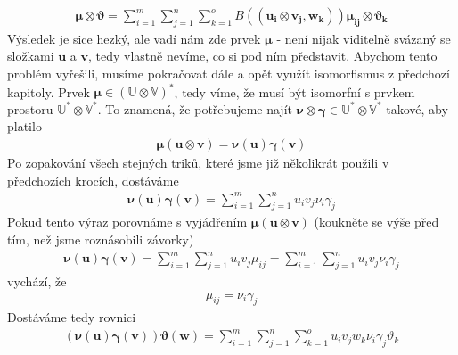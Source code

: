 \documentclass[a5paper,12pt]{amsbook}
\theoremstyle{definition}
\newcommand{\myvec}[1]{\bm{#1}}
\newcommand{\myspace}[1]{\mathbb{#1}}
\begin{document}
\begin{equation*}
\begin{split}
\myvec{\mu}\otimes\myvec{\vartheta} =
  \sum_{i=1}^{m}\sum_{j=1}^{n}\sum_{k=1}^{o} B((\myvec{u_i}\otimes\myvec{v_j}, \myvec{w_k}))
    \myvec{\mu_{ij}\otimes\myvec{\vartheta_k}}
\end{split}
\end{equation*}
Výsledek je sice hezký, ale vadí nám zde prvek $\myvec{\mu}$ - není nijak viditelně svázaný se složkami
$\myvec{u}$ a $\myvec{v}$, tedy vlastně nevíme, co si pod ním představit. Abychom tento problém
vyřešili, musíme pokračovat dále a opět využít isomorfismus z předchozí kapitoly. Prvek
$\myvec{\mu}\in(\myspace{U}\otimes\myspace{V})^*$, tedy víme, že musí být isomorfní s prvkem
prostoru $\myspace{U}^*\otimes\myspace{V}^*$. To znamená, že potřebujeme najít
$\myvec{\nu}\otimes\myvec{\gamma}\in\myspace{U}^*\otimes\myspace{V}^*$ takové, aby platilo
\begin{equation*}
\begin{split}
\myvec{\mu}(\myvec{u}\otimes\myvec{v}) = \myvec{\nu}(\myvec{u})\myvec{\gamma}(\myvec{v})
\end{split}
\end{equation*}
Po zopakování všech stejných triků, které jsme již několikrát použili v předchozích krocích,
dostáváme
\begin{equation*}
\begin{split}
\myvec{\nu}(\myvec{u})\myvec{\gamma}(\myvec{v}) = \sum_{i=1}^{m}\sum_{j=1}^{n}u_i v_j \nu_i\gamma_j
\end{split}
\end{equation*}
Pokud tento výraz porovnáme s vyjádřením $\myvec{\mu}(\myvec{u}\otimes\myvec{v})$ (koukněte se
výše před tím, než jsme roznásobili závorky)
\begin{equation*}
\begin{split}
\myvec{\nu}(\myvec{u})\myvec{\gamma}(\myvec{v}) =
  \sum_{i=1}^{m}\sum_{j=1}^{n}u_i v_j \mu_{ij}
  = \sum_{i=1}^{m}\sum_{j=1}^{n}u_i v_j \nu_i\gamma_j
\end{split}
\end{equation*}
vychází, že
\begin{equation*}
\begin{split}
\mu_{ij} = \nu_i\gamma_j
\end{split}
\end{equation*}
Dostáváme tedy rovnici
\begin{equation*}
\begin{split}
(\myvec{\nu}(\myvec{u})\myvec{\gamma}(\myvec{v}))\myvec{\vartheta}(\myvec{w}) = 
  \sum_{i=1}^{m}\sum_{j=1}^{n}\sum_{k=1}^{o}u_i v_j w_k \nu_i\gamma_j\vartheta_k
\end{split}
\end{equation*}
\end{document}
